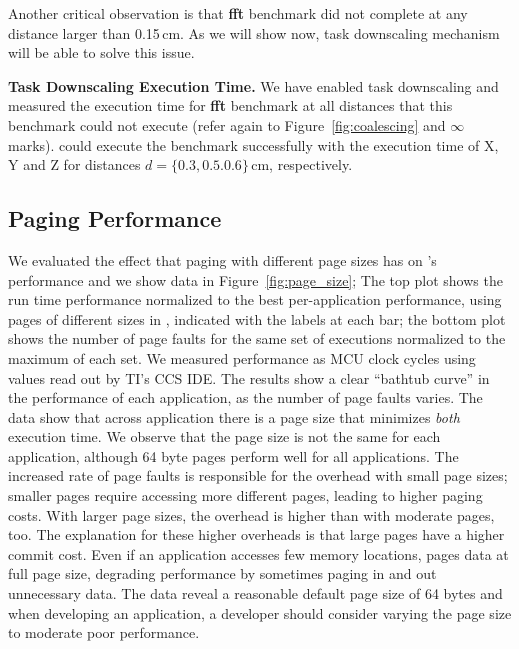 Another critical observation is that \textbf{fft} benchmark did not complete at any distance larger than 0.15\,cm. As we will show now, \sys task downscaling mechanism will be able to solve this issue.  

\textbf{Task Downscaling Execution Time.} We have enabled task downscaling and measured the execution time for \textbf{fft} benchmark at all distances that this benchmark could not execute (refer again to Figure~\ref{fig:coalescing} and $\infty$ marks). \sys could execute the benchmark successfully with the execution time of X, Y and Z for distances $d=\{0.3, 0.5. 0.6\}$\,cm, respectively.

\subsection{\sys Paging Performance}
\label{sec:results_memory_management}

We evaluated the effect that paging with different page sizes has on \sys's performance and we show data in Figure~\ref{fig:page_size}; The top plot shows the run time performance normalized to the best per-application performance, using pages of different sizes in \sys, indicated with the labels at each bar; the bottom plot shows the number of page faults for the same set of executions normalized to the maximum of each set. We measured performance as MCU clock cycles using values read out by TI's CCS IDE. The results show a clear ``bathtub curve'' in the performance of each application, as the number of page faults varies. The data show that across application there is a page size that minimizes \emph{both} execution time. We observe that the page size is not the same for each application, although 64 byte pages perform well for all applications. The increased rate of page faults is responsible for the overhead with small page sizes; smaller pages require accessing more different pages, leading to higher paging costs. With larger page sizes, the overhead is higher than with moderate pages, too. The explanation for these higher overheads is that large pages have a higher commit cost. Even if an application accesses few memory locations, \sys pages data at full page size, degrading performance by sometimes paging in and out unnecessary data. The data reveal a reasonable default page size of 64 bytes and when developing an application, a developer should consider varying the page size to moderate poor performance.

